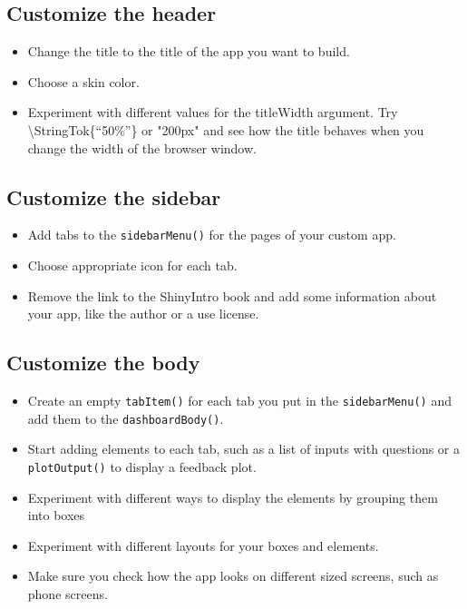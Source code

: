 \documentclass[
  oneside]{book}
\newcommand{\AttributeTok}[1]{\textcolor[rgb]{0.77,0.63,0.00}{#1}}
\newcommand{\StringTok}[1]{\textcolor[rgb]{0.31,0.60,0.02}{#1}}
\providecommand{\tightlist}{%
  \setlength{\itemsep}{0pt}\setlength{\parskip}{0pt}}
\begin{document}
\hypertarget{customize-the-header}{%
\subsection{Customize the header}\label{customize-the-header}}

\begin{itemize}
\tightlist
\item
  Change the \AttributeTok{title} to the title of the app you want to build.
\item
  Choose a \AttributeTok{skin} color.
\item
  Experiment with different values for the \AttributeTok{titleWidth} argument. Try \textbackslash StringTok\{``50\%''\} or \StringTok{"200px"} and see how the title behaves when you change the width of the browser window.
\end{itemize}

\hypertarget{customize-the-sidebar}{%
\subsection{Customize the sidebar}\label{customize-the-sidebar}}

\begin{itemize}
\tightlist
\item
  Add tabs to the \texttt{sidebarMenu}\texttt{()} for the pages of your custom app.
\item
  Choose appropriate \AttributeTok{icon} for each tab.
\item
  Remove the link to the ShinyIntro book and add some information about your app, like the author or a use license.
\end{itemize}

\hypertarget{customize-the-body}{%
\subsection{Customize the body}\label{customize-the-body}}

\begin{itemize}
\tightlist
\item
  Create an empty \texttt{tabItem}\texttt{()} for each tab you put in the \texttt{sidebarMenu}\texttt{()} and add them to the \texttt{dashboardBody}\texttt{()}.
\item
  Start adding elements to each tab, such as a list of inputs with questions or a \texttt{plotOutput}\texttt{()} to display a feedback plot.
\item
  Experiment with different ways to display the elements by grouping them into boxes
\item
  Experiment with different layouts for your boxes and elements.
\item
  Make sure you check how the app looks on different sized screens, such as phone screens.
\end{itemize}
\end{document}
